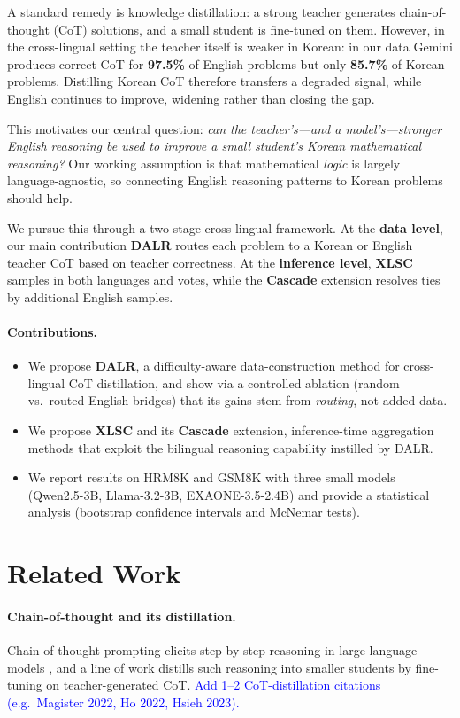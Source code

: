 \documentclass{article}
\newcommand{\note}[1]{\textcolor{blue}{{#1}}}
\begin{document}
A standard remedy is knowledge distillation: a strong teacher generates
chain-of-thought (CoT) solutions, and a small student is fine-tuned on
them. However, in the cross-lingual setting the teacher itself is
weaker in Korean: in our data Gemini produces correct CoT for
\textbf{97.5\%} of English problems but only \textbf{85.7\%} of Korean
problems. Distilling Korean CoT therefore transfers a degraded signal,
while English continues to improve, widening rather than closing the
gap.

This motivates our central question: \emph{can the teacher's---and a
model's---stronger English reasoning be used to improve a small
student's Korean mathematical reasoning?} Our working assumption is
that mathematical \emph{logic} is largely language-agnostic, so
connecting English reasoning patterns to Korean problems should help.

We pursue this through a two-stage cross-lingual framework. At the
\textbf{data level}, our main contribution \textbf{DALR} routes each
problem to a Korean or English teacher CoT based on teacher
correctness. At the \textbf{inference level}, \textbf{XLSC} samples in
both languages and votes, while the \textbf{Cascade} extension
resolves ties by additional English samples.

\paragraph{Contributions.}
\begin{itemize}
  \item We propose \textbf{DALR}, a difficulty-aware data-construction
  method for cross-lingual CoT distillation, and show via a controlled
  ablation (random vs.\ routed English bridges) that its gains stem from
  \emph{routing}, not added data.
  \item We propose \textbf{XLSC} and its \textbf{Cascade} extension,
  inference-time aggregation methods that exploit the bilingual
  reasoning capability instilled by DALR.
  \item We report results on HRM8K and GSM8K with three small models
  (Qwen2.5-3B, Llama-3.2-3B, EXAONE-3.5-2.4B) and provide a statistical
  analysis (bootstrap confidence intervals and McNemar tests).
\end{itemize}

\section{Related Work}
\paragraph{Chain-of-thought and its distillation.}
Chain-of-thought prompting elicits step-by-step reasoning in large
language models \citep{wei2022cot}, and a line of work distills such
reasoning into smaller students by fine-tuning on teacher-generated
CoT. \note{Add 1--2 CoT-distillation citations (e.g.\ Magister 2022, Ho
2022, Hsieh 2023).}
\end{document}
